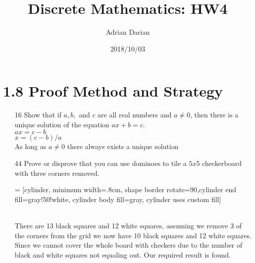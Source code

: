 \documentclass[a4paper]{article}
\title{Discrete Mathematics: HW4}
\author{Adrian Darian}
\date{2018/10/03}
\begin{document}
\maketitle

\section*{1.8 Proof Method and Strategy}
\begin{itemize}
  \item[16] Show that if $a, b,$ and $c$ are all real numbers and $a \neq 0$, then there is a unique solution of the equation $ax + b = c$. \\
  $ax = c - b$ \\
  $x = (c - b) / a$ \\
  As long as $a \neq 0$ there always exists a unique solution
  \item[44] Prove or disprove that you can use dominoes to tile a $5 x 5$ checkerboard with three corners removed. \\
  \begin{multicols}{2}
     = [cylinder, minimum width=.8cm, 
    shape border rotate=90,cylinder end fill=gray!50!white,
    cylinder body fill=gray, cylinder uses custom fill]
     \\
    There are 13 black squares and 12 white squares, assuming we remove 3 of the corners from the grid we now have 10 black squares and 12 white squares. Since we cannot cover the whole board with checkers due to the number of black and white squares not equaling out. Our required result is found.
  \end{multicols}
\end{itemize}
\end{document}
